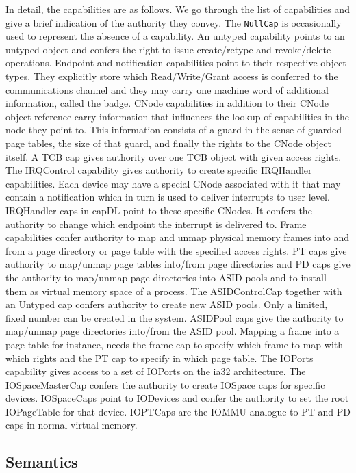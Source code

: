 \documentclass[a4paper,12pt]{article}
\begin{document}
In detail, the capabilities are as follows. We go through the list of 
capabilities and give a brief indication of the authority they convey. The 
\texttt{NullCap} is occasionally used to represent the absence of a capability. 
An untyped capability points to an untyped object and confers the right to 
issue create/retype and revoke/delete operations. Endpoint and notification
capabilities point to their respective object types. They explicitly 
store which Read/Write/Grant access is conferred to the communications channel 
and they may carry one machine word of additional information, called the 
badge. CNode capabilities in addition to their CNode object reference carry 
information that influences the lookup of capabilities in the node they point 
to. This information consists of a guard in the sense of guarded page tables, 
the size of that guard, and finally the rights to the CNode object itself. A 
TCB cap gives authority over one TCB object with given access rights. The 
IRQControl capability gives authority to create specific IRQHandler 
capabilities. Each device may have a special CNode associated with it that may 
contain a notification which in turn is used to deliver interrupts to 
user level. IRQHandler caps in capDL point to these specific CNodes. It confers 
the authority to change which endpoint the interrupt is delivered to. Frame 
capabilities confer authority to map and unmap physical memory frames into and 
from a page directory or page table with the specified access rights. PT caps 
give authority to map/unmap page tables into/from page directories and PD caps 
give the authority to map/unmap page directories into ASID pools and to install 
them as virtual memory space of a process. The ASIDControlCap together with an 
Untyped cap confers authority to create new ASID pools. Only a limited, fixed 
number can be created in the system. ASIDPool caps give the authority to 
map/unmap page directories into/from the ASID pool. Mapping a frame into a page 
table for instance, needs the frame cap to specify which frame to map with 
which rights and the PT cap to specify in which page table. The IOPorts 
capability gives access to a set of IOPorts on the ia32 architecture. The 
IOSpaceMasterCap confers the authority to create IOSpace caps for specific 
devices. IOSpaceCaps point to IODevices and confer the authority to set the 
root IOPageTable for that device. IOPTCaps are the IOMMU analogue to PT and PD 
caps in normal virtual memory.



\subsection{Semantics}
\end{document}
